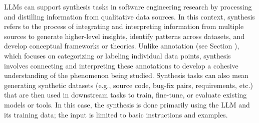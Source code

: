 \label{sec:llms-for-synthesis}


LLMs can support synthesis tasks in software engineering research by processing and distilling information from qualitative data sources.
In this context, synthesis refers to the process of integrating and interpreting information from multiple sources to generate higher-level insights, identify patterns across datasets, and develop conceptual frameworks or theories.
Unlike annotation (see Section \annotators), which focuses on categorizing or labeling individual data points, synthesis involves connecting and interpreting these annotations to develop a cohesive understanding of the phenomenon being studied.
Synthesis tasks can also mean generating synthetic datasets (e.g., source code, bug-fix pairs, requirements, etc.) that are then used in downstream tasks to train, fine-tune, or evaluate existing models or tools.
In this case, the synthesis is done primarily using the LLM and its training data; the input is limited to basic instructions and examples.


